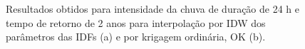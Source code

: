 \documentclass[
]{agujournal2019}
\begin{document}
\begin{figure}
\begin{minipage}{\linewidth}
{}


\end{minipage}%

\caption{\label{fig-Figura31}Resultados obtidos para intensidade da
chuva de duração de 24 h e tempo de retorno de 2 anos para interpolação
por IDW dos parâmetros das IDFs (a) e por krigagem ordinária, OK (b).}

\end{figure}%

\begin{figure}

\begin{minipage}{\linewidth}



\end{minipage}%
\newline
\begin{minipage}{\linewidth}

\centering{

}
\end{minipage}
\end{figure}
\end{document}
